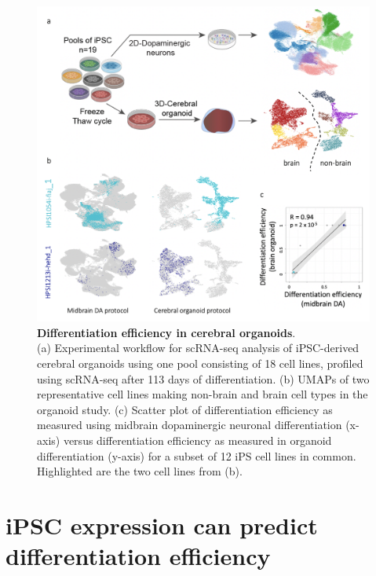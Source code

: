\begin{figure}[htbp]
\centering
\includegraphics[width=14cm]{Chapter5/Fig/neuroseq_organoids.png}
\caption[Differentiation efficiency in cerebral organoids]{\textbf{Differentiation efficiency in cerebral organoids}.\\
(a) Experimental workflow for scRNA-seq analysis of iPSC-derived cerebral organoids using one pool consisting of 18 cell lines, profiled using scRNA-seq after 113 days of differentiation.
(b) UMAPs of two representative cell lines making non-brain and brain cell types in the organoid study. 
(c) Scatter plot of differentiation efficiency as measured using midbrain dopaminergic neuronal differentiation (x-axis) versus differentiation efficiency as measured in organoid differentiation (y-axis) for a subset of 12 iPS cell lines in common. 
Highlighted are the two cell lines from (b).}
\label{fig:neuroseq_organoids}
\end{figure}


\clearpage

\section{iPSC expression can predict differentiation efficiency}
\label{sec:neuroseq_ips}

